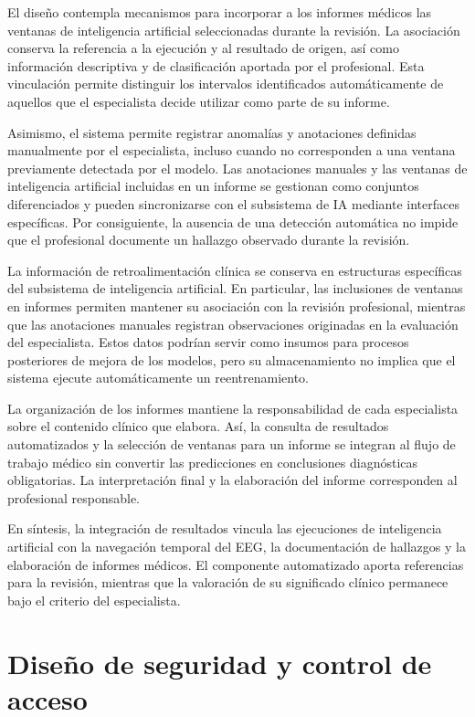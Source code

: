 El diseño contempla mecanismos para incorporar a los informes médicos las ventanas de inteligencia artificial seleccionadas durante la revisión. La asociación conserva la referencia a la ejecución y al resultado de origen, así como información descriptiva y de clasificación aportada por el profesional. Esta vinculación permite distinguir los intervalos identificados automáticamente de aquellos que el especialista decide utilizar como parte de su informe.

Asimismo, el sistema permite registrar anomalías y anotaciones definidas manualmente por el especialista, incluso cuando no corresponden a una ventana previamente detectada por el modelo. Las anotaciones manuales y las ventanas de inteligencia artificial incluidas en un informe se gestionan como conjuntos diferenciados y pueden sincronizarse con el subsistema de IA mediante interfaces específicas. Por consiguiente, la ausencia de una detección automática no impide que el profesional documente un hallazgo observado durante la revisión.

La información de retroalimentación clínica se conserva en estructuras específicas del subsistema de inteligencia artificial. En particular, las inclusiones de ventanas en informes permiten mantener su asociación con la revisión profesional, mientras que las anotaciones manuales registran observaciones originadas en la evaluación del especialista. Estos datos podrían servir como insumos para procesos posteriores de mejora de los modelos, pero su almacenamiento no implica que el sistema ejecute automáticamente un reentrenamiento.

La organización de los informes mantiene la responsabilidad de cada especialista sobre el contenido clínico que elabora. Así, la consulta de resultados automatizados y la selección de ventanas para un informe se integran al flujo de trabajo médico sin convertir las predicciones en conclusiones diagnósticas obligatorias. La interpretación final y la elaboración del informe corresponden al profesional responsable.

En síntesis, la integración de resultados vincula las ejecuciones de inteligencia artificial con la navegación temporal del EEG, la documentación de hallazgos y la elaboración de informes médicos. El componente automatizado aporta referencias para la revisión, mientras que la valoración de su significado clínico permanece bajo el criterio del especialista.


\section{Diseño de seguridad y control de acceso}
\label{sec:seguridad-control-acceso}

